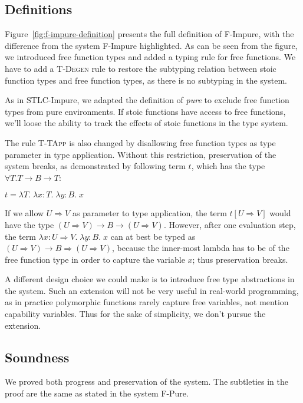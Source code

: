 \subsection{Definitions}

Figure~\ref{fig:f-impure-definition} presents the full definition of
F-Impure, with the difference from the system F-Impure highlighted. As
can be seen from the figure, we introduced free function types and
added a typing rule for free functions. We have to add a
\textsc{T-Degen} rule to restore the subtyping relation between stoic
function types and free function types, as there is no subtyping in
the system.

As in STLC-Impure, we adapted the definition of \emph{pure} to exclude
free function types from pure environments. If stoic functions have
access to free functions, we'll loose the ability to track the effects
of stoic functions in the type system.

The rule \textsc{T-TApp} is also changed by disallowing free function
types as type parameter in type application. Without this restriction,
preservation of the system breaks, as demonstrated by following term
$t$, which has the type $\forall T. T \to B \to T$:

\begin{center}
  $t = \lambda T. \; \lambda x:T. \; \lambda y:B. \; x$
\end{center}

If we allow $U \Rightarrow V$ as parameter to type application, the
term $t [U \Rightarrow V]$ would have the type
$(U \Rightarrow V) \to B \to (U \Rightarrow V)$.  However, after one
evaluation step, the term
$\lambda x:U \Rightarrow V. \; \lambda y:B. \; x$ can at best be typed
as $(U \Rightarrow V) \to B \Rightarrow (U \Rightarrow V)$, because
the inner-most lambda has to be of the free function type in order to
capture the variable $x$; thus preservation breaks.

A different design choice we could make is to introduce free type
abstractions in the system. Such an extension will not be very useful
in real-world programming, as in practice polymorphic functions rarely
capture free variables, not mention capability variables. Thus for the
sake of simplicity, we don't pursue the extension.

\subsection{Soundness}

We proved both progress and preservation of the system. The subtleties
in the proof are the same as stated in the system F-Pure.

